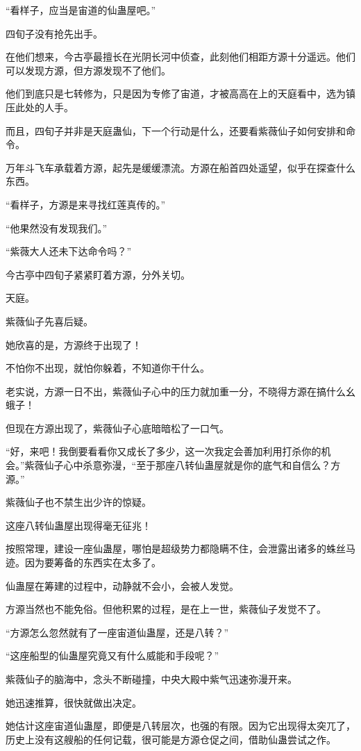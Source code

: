 \begin{this_body}
“看样子，应当是宙道的仙蛊屋吧。”

四旬子没有抢先出手。

在他们想来，今古亭最擅长在光阴长河中侦查，此刻他们相距方源十分遥远。他们可以发现方源，但方源发现不了他们。

他们到底只是七转修为，只是因为专修了宙道，才被高高在上的天庭看中，选为镇压此处的人手。

而且，四旬子并非是天庭蛊仙，下一个行动是什么，还要看紫薇仙子如何安排和命令。

万年斗飞车承载着方源，起先是缓缓漂流。方源在船首四处遥望，似乎在探查什么东西。

“看样子，方源是来寻找红莲真传的。”

“他果然没有发现我们。”

“紫薇大人还未下达命令吗？”

今古亭中四旬子紧紧盯着方源，分外关切。

天庭。

紫薇仙子先喜后疑。

她欣喜的是，方源终于出现了！

不怕你不出现，就怕你躲着，不知道你干什么。

老实说，方源一日不出，紫薇仙子心中的压力就加重一分，不晓得方源在搞什么幺蛾子！

但现在方源出现了，紫薇仙子心底暗暗松了一口气。

“好，来吧！我倒要看看你又成长了多少，这一次我定会善加利用打杀你的机会。”紫薇仙子心中杀意弥漫，“至于那座八转仙蛊屋就是你的底气和自信么？方源。”

紫薇仙子也不禁生出少许的惊疑。

这座八转仙蛊屋出现得毫无征兆！

按照常理，建设一座仙蛊屋，哪怕是超级势力都隐瞒不住，会泄露出诸多的蛛丝马迹。因为要筹备的东西实在太多了。

仙蛊屋在筹建的过程中，动静就不会小，会被人发觉。

方源当然也不能免俗。但他积累的过程，是在上一世，紫薇仙子发觉不了。

“方源怎么忽然就有了一座宙道仙蛊屋，还是八转？”

“这座船型的仙蛊屋究竟又有什么威能和手段呢？”

紫薇仙子的脑海中，念头不断碰撞，中央大殿中紫气迅速弥漫开来。

她迅速推算，很快就做出决定。

她估计这座宙道仙蛊屋，即便是八转层次，也强的有限。因为它出现得太突兀了，历史上没有这艘船的任何记载，很可能是方源仓促之间，借助仙蛊尝试之作。


\end{this_body}
